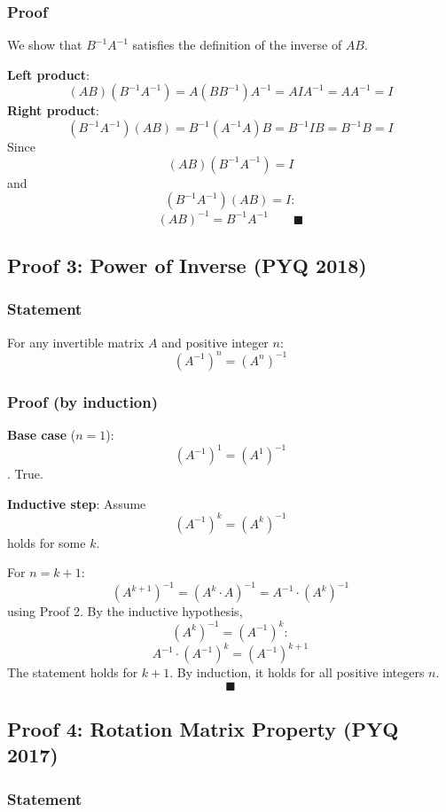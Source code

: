\documentclass[
]{article}
\begin{document}
\subsubsection{Proof}\label{proof-4}

We show that \(B^{-1}A^{-1}\) satisfies the definition of the inverse of
\(AB\).

\textbf{Left product}:
\[
(AB)(B^{-1}A^{-1}) = A(BB^{-1})A^{-1} = AIA^{-1} = AA^{-1} = I
\]
\textbf{Right product}:
\[
(B^{-1}A^{-1})(AB) = B^{-1}(A^{-1}A)B = B^{-1}IB = B^{-1}B = I
\]
Since
\[
(AB)(B^{-1}A^{-1}) = I
\]
and
\[
(B^{-1}A^{-1})(AB) = I:
\]
\[
(AB)^{-1} = B^{-1}A^{-1} \qquad \blacksquare
\]

\subsection{Proof 3: Power of Inverse (PYQ
2018)}\label{proof-3-power-of-inverse-pyq-2018}

\subsubsection{Statement}\label{statement-5}

For any invertible matrix \(A\) and positive integer \(n\):
\[
(A^{-1})^n = (A^n)^{-1}
\]
\subsubsection{Proof (by induction)}\label{proof-by-induction}

\textbf{Base case} (\(n = 1\)):
\[
(A^{-1})^1 = (A^1)^{-1}
\]
. True.

\textbf{Inductive step}: Assume
\[
(A^{-1})^k = (A^k)^{-1}
\]
holds for some \(k\).

For \(n = k + 1\):
\[
(A^{k+1})^{-1} = (A^k \cdot A)^{-1} = A^{-1} \cdot (A^k)^{-1}
\]
using Proof 2. By the inductive hypothesis,
\[
(A^k)^{-1} = (A^{-1})^k:
\]
\[
A^{-1} \cdot (A^{-1})^k = (A^{-1})^{k+1}
\]
The statement holds for \(k + 1\). By induction, it holds for all
positive integers \(n\).
\[
\blacksquare
\]

\subsection{Proof 4: Rotation Matrix Property (PYQ
2017)}\label{proof-4-rotation-matrix-property-pyq-2017}

\subsubsection{Statement}\label{statement-6}
\end{document}
